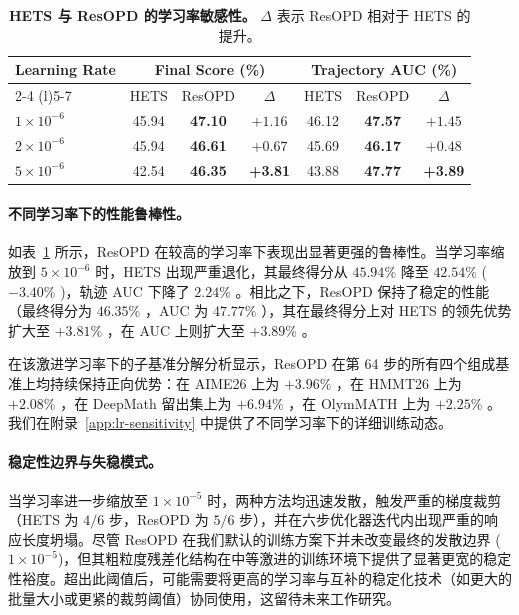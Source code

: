 \begin{table}[t]
\centering
\small
\caption{\textbf{HETS 与 ResOPD 的学习率敏感性。} $\Delta$ 表示 ResOPD 相对于 HETS 的提升。}
\vspace{-2mm}
\label{tab:lr-sensitivity}
\renewcommand{\arraystretch}{1.18}
\setlength{\tabcolsep}{7pt}
\begin{tabular}{@{}l cc c cc c@{}}
\toprule
\multirow{2}{*}{\textbf{Learning Rate}}
& \multicolumn{3}{c}{\textbf{Final Score (\%)}}
& \multicolumn{3}{c}{\textbf{Trajectory AUC (\%)}} \\
\cmidrule(lr){2-4} \cmidrule(l){5-7}
& HETS & ResOPD & $\Delta$
& HETS & ResOPD & $\Delta$ \\
\midrule
$1\times10^{-6}$ & 45.94 & \textbf{47.10} & $+1.16$ & 46.12 & \textbf{47.57} & $+1.45$ \\
$2\times10^{-6}$ & 45.94 & \textbf{46.61} & $+0.67$ & 45.69 & \textbf{46.17} & $+0.48$ \\
$5\times10^{-6}$ & 42.54 & \textbf{46.35} & \textbf{+3.81} & 43.88 & \textbf{47.77} & \textbf{+3.89} \\
\bottomrule
\end{tabular}
\vspace{-4mm}
\end{table}

\paragraph{不同学习率下的性能鲁棒性。}
如表~\ref{tab:lr-sensitivity} 所示，ResOPD 在较高的学习率下表现出显著更强的鲁棒性。当学习率缩放到 $5\times10^{-6}$ 时，HETS 出现严重退化，其最终得分从 $45.94\%$ 降至 $42.54\%$  ($-3.40\%$ )，轨迹 AUC 下降了 $2.24\%$ 。相比之下，ResOPD 保持了稳定的性能（最终得分为 $46.35\%$ ，AUC 为 $47.77\%$ ），其在最终得分上对 HETS 的领先优势扩大至 $+3.81\%$ ，在 AUC 上则扩大至 $+3.89\%$ 。

在该激进学习率下的子基准分解分析显示，ResOPD 在第 64 步的所有四个组成基准上均持续保持正向优势：在 AIME26 上为 $+3.96\%$ ，在 HMMT26 上为 $+2.08\%$ ，在 DeepMath 留出集上为 $+6.94\%$ ，在 OlymMATH 上为 $+2.25\%$ 。我们在附录~\ref{app:lr-sensitivity} 中提供了不同学习率下的详细训练动态。  
\vspace{-4mm}

\paragraph{稳定性边界与失稳模式。}
当学习率进一步缩放至 $1\times10^{-5}$ 时，两种方法均迅速发散，触发严重的梯度裁剪（HETS 为 $4/6$ 步，ResOPD 为 $5/6$ 步），并在六步优化器迭代内出现严重的响应长度坍塌。尽管 ResOPD 在我们默认的训练方案下并未改变最终的发散边界 ($1\times10^{-5}$)，但其粗粒度残差化结构在中等激进的训练环境下提供了显著更宽的稳定性裕度。超出此阈值后，可能需要将更高的学习率与互补的稳定化技术（如更大的批量大小或更紧的裁剪阈值）协同使用，这留待未来工作研究。
\vspace{-4mm}

